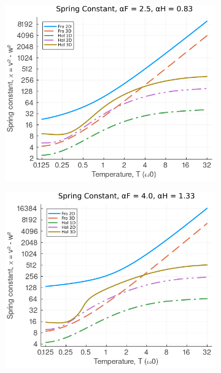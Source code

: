 \begin{figure}[!tbp]
  \begin{subfigure}[b]{0.49\textwidth}
    \includegraphics[width=\textwidth]{figures/spring_temp_25_083.png}
  \end{subfigure}
  \hfill
  \begin{subfigure}[b]{0.49\textwidth}
    \includegraphics[width=\textwidth]{figures/spring_temp_4_133.png}
  \end{subfigure}
  \begin{subfigure}[b]{0.49\textwidth}

\end{subfigure}
\end{figure}
